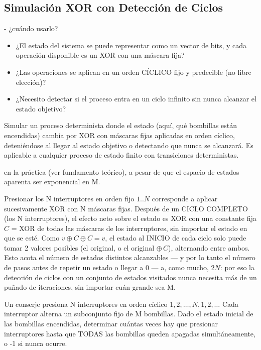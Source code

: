 \subsection{Simulación XOR con Detección de Ciclos}

 - ¿cuándo usarlo?

\begin{itemize}
\item ¿El estado del sistema se puede representar como un vector de bits, y cada operación disponible es un XOR con una máscara fija?
\item ¿Las operaciones se aplican en un orden CÍCLICO fijo y predecible (no libre elección)?
\item ¿Necesito detectar si el proceso entra en un ciclo infinito sin nunca alcanzar el estado objetivo?
\end{itemize}

 Simular un proceso determinista donde el estado (aquí, qué bombillas están encendidas) cambia por XOR con máscaras fijas aplicadas en orden cíclico, deteniéndose al llegar al estado objetivo o detectando que nunca se alcanzará. Es aplicable a cualquier proceso de estado finito con transiciones deterministas.

  en la práctica (ver fundamento teórico), a pesar de que el espacio de estados aparenta ser exponencial en M.

 Presionar los N interruptores en orden fijo $1..N$ corresponde a aplicar sucesivamente XOR con N máscaras fijas. Después de un CICLO COMPLETO (los N interruptores), el efecto neto sobre el estado es XOR con una constante fija $C$ = XOR de todas las máscaras de los interruptores, sin importar el estado en que se esté. Como $v \oplus C \oplus C = v$, el estado al INICIO de cada ciclo solo puede tomar 2 valores posibles (el original, o el original $\oplus\, C$), alternando entre ambos. Esto acota el número de estados distintos alcanzables — y por lo tanto el número de pasos antes de repetir un estado o llegar a 0 — a, como mucho, $2N$: por eso la detección de ciclos con un conjunto de estados visitados nunca necesita más de un puñado de iteraciones, sin importar cuán grande sea M.


Un conserje presiona N interruptores en orden cíclico $1,2,\ldots,N,1,2,\ldots$ Cada interruptor alterna un subconjunto fijo de M bombillas. Dado el estado inicial de las bombillas encendidas, determinar cuántas veces hay que presionar interruptores hasta que TODAS las bombillas queden apagadas simultáneamente, o -1 si nunca ocurre.

